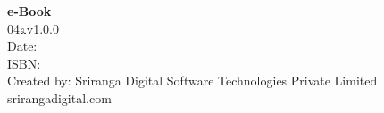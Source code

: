 \thispagestyle{empty}

 \textbf{e-Book}\\
 04೩v1.0.0\\
 Date: \\
 ISBN: \\
 Created by: Sriranga Digital Software Technologies Private Limited\\srirangadigital.com

